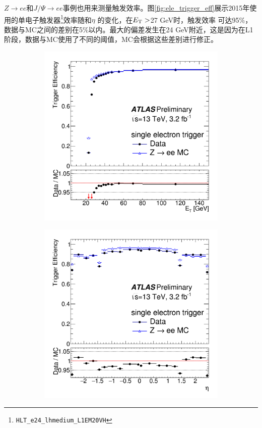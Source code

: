 $Z\rightarrow ee$和$J/\Psi\rightarrow ee$事例也用来测量触发效率\cite{ATLAS-CONF-2016-024}。图\ref{fig:ele_trigger_eff}展示2015年使用的单电子触发器\footnote{\texttt{HLT\_e24\_lhmedium\_L1EM20VH}}效率随\et 和$\eta$ 的变化，在$E_{\text{T}}>$27 GeV时，触发效率
可达95\%，数据与MC之间的差别在5\%以内。最大的偏差发生在24 GeV附近，这是因为在L1阶段，数据与MC使用了不同的阈值，MC会根据这些差别进行修正。
\begin{figure}[h]
\begin{center}
\begin{subfigure}[b]{0.45\textwidth}
\centering
      \includegraphics[width=\textwidth]{fig/ele_trigger_eff_et.png}
     \caption{}
      \label{fig:ele_trigger_et_eff}
  \end{subfigure}
 \begin{subfigure}[b]{0.45\textwidth}
 \centering
      \includegraphics[width=\textwidth]{fig/ele_trigger_eff_eta.png}

\end{subfigure}
\end{center}
\end{figure}
